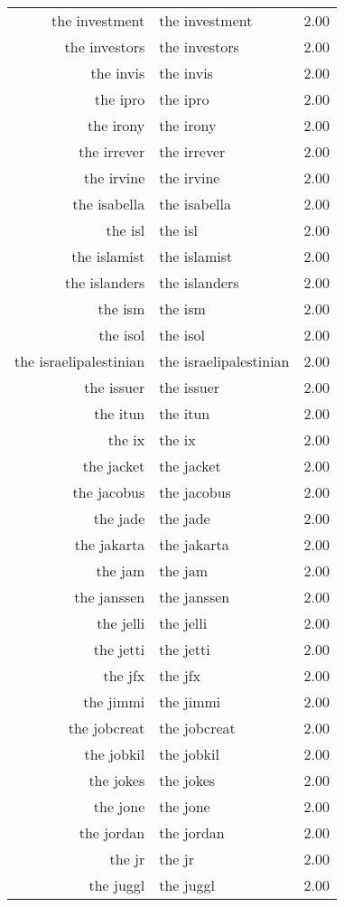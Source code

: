 \begin{table}[ht]
\begin{tabular}{rlr}
  the investment & the investment & 2.00 \\ 
  the investors & the investors & 2.00 \\ 
  the invis & the invis & 2.00 \\ 
  the ipro & the ipro & 2.00 \\ 
  the irony & the irony & 2.00 \\ 
  the irrever & the irrever & 2.00 \\ 
  the irvine & the irvine & 2.00 \\ 
  the isabella & the isabella & 2.00 \\ 
  the isl & the isl & 2.00 \\ 
  the islamist & the islamist & 2.00 \\ 
  the islanders & the islanders & 2.00 \\ 
  the ism & the ism & 2.00 \\ 
  the isol & the isol & 2.00 \\ 
  the israelipalestinian & the israelipalestinian & 2.00 \\ 
  the issuer & the issuer & 2.00 \\ 
  the itun & the itun & 2.00 \\ 
  the ix & the ix & 2.00 \\ 
  the jacket & the jacket & 2.00 \\ 
  the jacobus & the jacobus & 2.00 \\ 
  the jade & the jade & 2.00 \\ 
  the jakarta & the jakarta & 2.00 \\ 
  the jam & the jam & 2.00 \\ 
  the janssen & the janssen & 2.00 \\ 
  the jelli & the jelli & 2.00 \\ 
  the jetti & the jetti & 2.00 \\ 
  the jfx & the jfx & 2.00 \\ 
  the jimmi & the jimmi & 2.00 \\ 
  the jobcreat & the jobcreat & 2.00 \\ 
  the jobkil & the jobkil & 2.00 \\ 
  the jokes & the jokes & 2.00 \\ 
  the jone & the jone & 2.00 \\ 
  the jordan & the jordan & 2.00 \\ 
  the jr & the jr & 2.00 \\ 
  the juggl & the juggl & 2.00 \\ 

\end{tabular}
\end{table}
